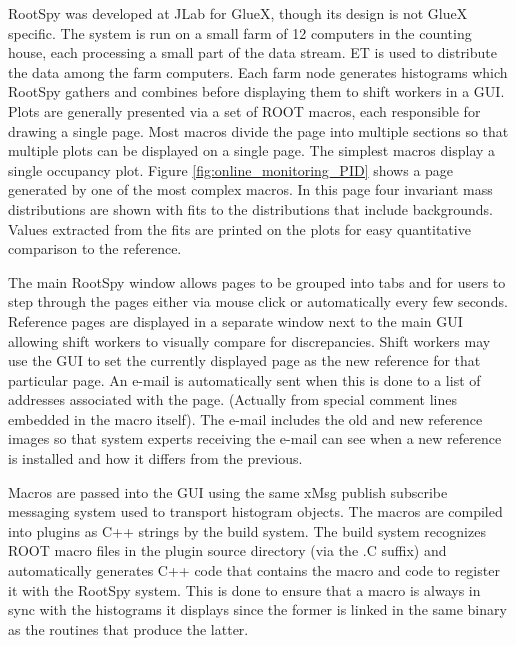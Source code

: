 RootSpy was developed at JLab for GlueX, though its design is not GlueX specific. The system is run on a small farm of 12 computers in the counting house, each processing a small part of the data stream. ET is used to distribute the data among the farm computers. Each farm node generates histograms which RootSpy gathers and combines before displaying them to shift workers in a GUI.
Plots are generally presented via a set of ROOT macros, each responsible for drawing a single page. Most macros divide the page into multiple sections so that multiple plots can be displayed on a single page. The simplest macros display a single occupancy plot. Figure \ref{fig:online_monitoring_PID} shows a page generated by one of the most complex macros. In this page four invariant mass distributions are shown with fits to the distributions that include backgrounds. Values extracted from the fits are printed on the plots for easy quantitative comparison to the reference. 

The main RootSpy window allows pages to be grouped into tabs and for users to step through the pages either via mouse click or automatically every few seconds. Reference pages are displayed in a separate window next to the main GUI allowing shift workers to visually compare for discrepancies. Shift workers may use the GUI to set the currently displayed page as the new reference for that particular page. An e-mail is automatically sent when this is done to a list of addresses associated with the page. (Actually from special comment lines embedded in the macro itself). The e-mail includes the old and new reference images so that system experts receiving the e-mail can see when a new reference is installed and how it differs from the previous.

Macros are passed into the GUI using the same xMsg\cite{xmsg} publish subscribe messaging system used to transport histogram objects. The macros are compiled into plugins as C++ strings by the build system. The build system recognizes ROOT macro files in the plugin source directory (via the .C suffix) and automatically generates C++ code that contains the macro and code to register it with the RootSpy system. This is done to ensure that a macro is always in sync with the histograms it displays since the former is linked in the same binary as the routines that produce the latter.

